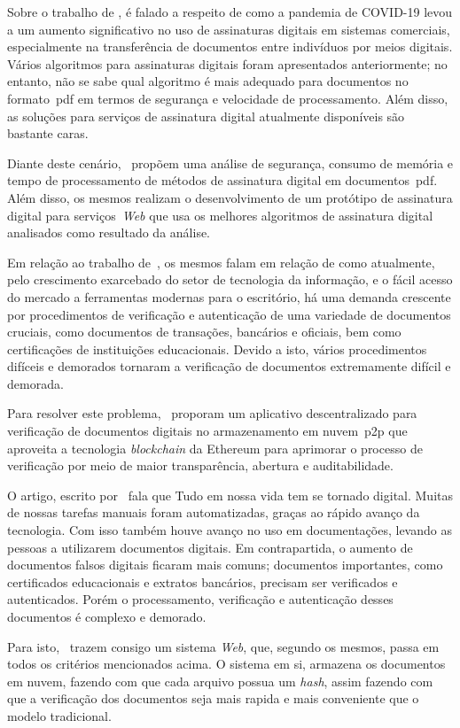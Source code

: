 Sobre o trabalho de \textcite{ramadhan2023}, é falado a respeito de como a
pandemia de COVID-19 levou a um aumento significativo no uso de assinaturas
digitais em sistemas comerciais, especialmente na transferência de documentos
entre indivíduos por meios digitais.
Vários algoritmos para assinaturas digitais foram apresentados anteriormente;
no entanto, não se sabe qual algoritmo é mais adequado para documentos no
formato~\acrfull{pdf} em termos de segurança e velocidade de processamento.
Além disso, as soluções para serviços de assinatura digital atualmente
disponíveis são bastante caras.

Diante deste cenário,~\textcite{ramadhan2023} propõem uma análise de segurança,
consumo de memória e tempo de processamento de métodos de assinatura
digital em documentos~\acrshort{pdf}.
Além disso, os mesmos realizam o desenvolvimento de um protótipo de
assinatura digital para serviços~\textit{Web} que usa os melhores
algoritmos de assinatura digital analisados como resultado da análise.

Em relação ao trabalho de~\textcite{iman2021}, os mesmos falam em relação de
como atualmente, pelo crescimento exarcebado do setor de tecnologia da
informação, e o fácil acesso do mercado a ferramentas modernas para o
escritório, há uma demanda crescente por procedimentos de verificação e
autenticação de uma variedade de documentos cruciais, como documentos de
transações, bancários e oficiais, bem como certificações de instituições
educacionais.
Devido a isto, vários procedimentos difíceis e demorados tornaram a verificação
de documentos extremamente difícil e demorada.

Para resolver este problema,~\textcite{iman2021} proporam um aplicativo \textcite{Web}
descentralizado para verificação de documentos digitais no armazenamento em
nuvem~\acrshort{p2p} que aproveita a tecnologia \textit{blockchain} da
Ethereum para aprimorar o processo de verificação por meio de maior
transparência, abertura e auditabilidade.

O artigo, escrito por~\textcite{shree2022} fala que Tudo em nossa vida tem se
tornado digital.
Muitas de nossas tarefas manuais foram automatizadas, graças ao rápido avanço
da tecnologia.
Com isso também houve avanço no uso em documentações, levando as pessoas a
utilizarem documentos digitais.
Em contrapartida, o aumento de documentos falsos digitais ficaram mais
comuns; documentos importantes, como certificados educacionais e extratos
bancários, precisam ser verificados e autenticados.
Porém o processamento, verificação e autenticação desses documentos é complexo e
demorado.


Para isto,~\textcite{shree2022} trazem consigo um sistema \textit{Web}, que,
segundo os mesmos, passa em todos os critérios mencionados acima.
O sistema em si, armazena os documentos em nuvem, fazendo com que cada
arquivo possua um \textit{hash}\hashfootnote, assim fazendo com que a
verificação dos
documentos seja mais rapida e mais conveniente que o modelo tradicional.

